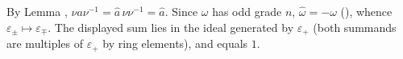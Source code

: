 By Lemma , $\nu a \nu^{-1} = \hat{a}\,\nu\nu^{-1} = \hat{a}$. Since $\omega$ has odd grade $n$, $\hat{\omega} = -\omega$ (), whence $\varepsilon_\pm \mapsto \varepsilon_\mp$. The displayed sum lies in the ideal generated by $\varepsilon_+$ (both summands are multiples of $\varepsilon_+$ by ring elements), and equals $1$.
